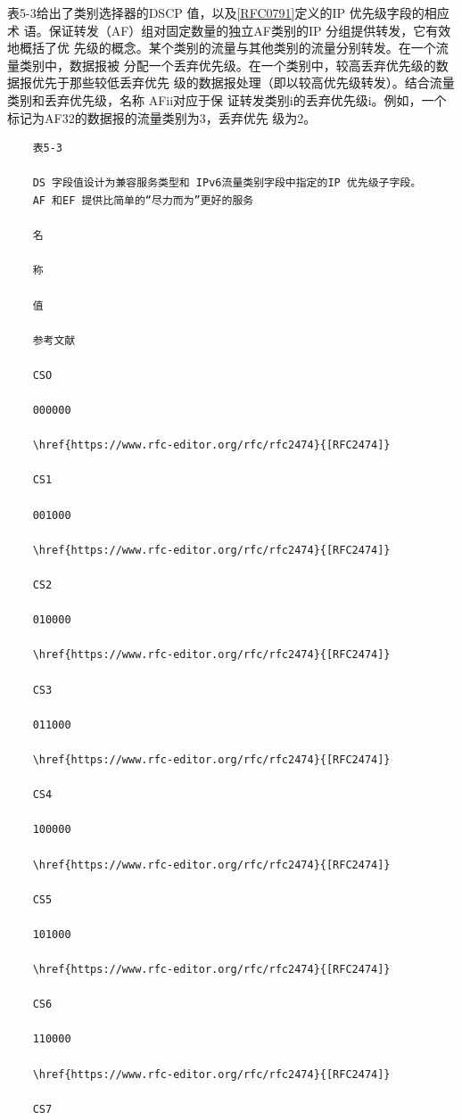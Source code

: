 表5-3给出了类别选择器的DSCP 值，以及\href{https://www.rfc-editor.org/rfc/rfc0791}{[RFC0791]}定义的IP 优先级字段的相应术
语。保证转发（AF）组对固定数量的独立AF类别的IP 分组提供转发，它有效地概括了优
先级的概念。某个类别的流量与其他类别的流量分别转发。在一个流量类别中，数据报被
分配一个丢弃优先级。在一个类别中，较高丢弃优先级的数据报优先于那些较低丢弃优先
级的数据报处理（即以较高优先级转发）。结合流量类别和丢弃优先级，名称 AFii对应于保
证转发类别i的丢弃优先级i。例如，一个标记为AF32的数据报的流量类别为3，丢弃优先
级为2。

\begin{verbatim}
    表5-3
    
    DS 字段值设计为兼容服务类型和 IPv6流量类别字段中指定的IP 优先级子字段。
    AF 和EF 提供比简单的“尽力而为”更好的服务
    
    名
    
    称
    
    值
    
    参考文献
    
    CSO
    
    000000
    
    \href{https://www.rfc-editor.org/rfc/rfc2474}{[RFC2474]}
    
    CS1
    
    001000
    
    \href{https://www.rfc-editor.org/rfc/rfc2474}{[RFC2474]}
    
    CS2
    
    010000
    
    \href{https://www.rfc-editor.org/rfc/rfc2474}{[RFC2474]}
    
    CS3
    
    011000
    
    \href{https://www.rfc-editor.org/rfc/rfc2474}{[RFC2474]}
    
    CS4
    
    100000
    
    \href{https://www.rfc-editor.org/rfc/rfc2474}{[RFC2474]}
    
    CS5
    
    101000
    
    \href{https://www.rfc-editor.org/rfc/rfc2474}{[RFC2474]}
    
    CS6
    
    110000
    
    \href{https://www.rfc-editor.org/rfc/rfc2474}{[RFC2474]}
    
    CS7
    

\end{verbatim}
